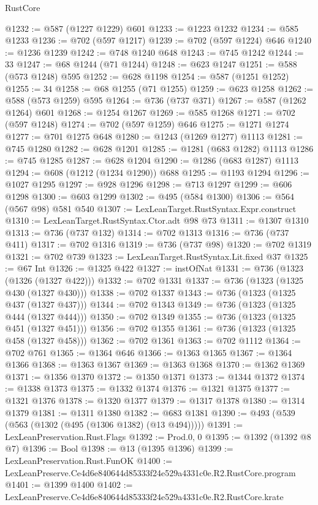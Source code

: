 \begin{lexlean}{RustCore}
\begin{coremodule}
@1232 := @587 (@1227 @1229) @601
@1233 := @1223 @1232
@1234 := @585 @1233
@1236 := @702 (@597 @1217)
@1239 := @702 (@597 @1224) @646
@1240 := @1236 @1239
@1242 := @748 @1240 @648
@1243 := @745 @1242
@1244 := 33
@1247 := @68 @1244 (@71 @1244)
@1248 := @623 @1247
@1251 := @588 (@573 @1248) @595
@1252 := @628 @1198
@1254 := @587 (@1251 @1252)
@1255 := 34
@1258 := @68 @1255 (@71 @1255)
@1259 := @623 @1258
@1262 := @588 (@573 @1259) @595
@1264 := @736 (@737 @371)
@1267 := @587 (@1262 @1264) @601
@1268 := @1254 @1267
@1269 := @585 @1268
@1271 := @702 (@597 @1248)
@1274 := @702 (@597 @1259) @646
@1275 := @1271 @1274
@1277 := @701 @1275 @648
@1280 := @1243 (@1269 @1277) @1113
@1281 := @745 @1280
@1282 := @628 @1201
@1285 := @1281 (@683 @1282) @1113
@1286 := @745 @1285
@1287 := @628 @1204
@1290 := @1286 (@683 @1287) @1113
@1294 := @608 (@1212 (@1234 @1290)) @688
@1295 := @1193 @1294
@1296 := @1027 @1295
@1297 := @928 @1296
@1298 := @713 @1297
@1299 := @606 @1298
@1300 := @603 @1299
@1302 := @495 (@584 @1300)
@1306 := @564 (@567 @98) @581 @540
@1307 := LexLeanTarget.RustSyntax.Expr.construct
@1310 := LexLeanTarget.RustSyntax.Ctor.adt @98 @73
@1311 := @1307 @1310
@1313 := @736 (@737 @132)
@1314 := @702 @1313
@1316 := @736 (@737 @411)
@1317 := @702 @1316
@1319 := @736 (@737 @98)
@1320 := @702 @1319
@1321 := @702 @739
@1323 := LexLeanTarget.RustSyntax.Lit.fixed @37
@1325 := @67 Int
@1326 := @1325 @422
@1327 := instOfNat
@1331 := @736 (@1323 (@1326 (@1327 @422)))
@1332 := @702 @1331
@1337 := @736 (@1323 (@1325 @430 (@1327 @430)))
@1338 := @702 @1337
@1343 := @736 (@1323 (@1325 @437 (@1327 @437)))
@1344 := @702 @1343
@1349 := @736 (@1323 (@1325 @444 (@1327 @444)))
@1350 := @702 @1349
@1355 := @736 (@1323 (@1325 @451 (@1327 @451)))
@1356 := @702 @1355
@1361 := @736 (@1323 (@1325 @458 (@1327 @458)))
@1362 := @702 @1361
@1363 := @702 @1112
@1364 := @702 @761
@1365 := @1364 @646
@1366 := @1363 @1365
@1367 := @1364 @1366
@1368 := @1363 @1367
@1369 := @1363 @1368
@1370 := @1362 @1369
@1371 := @1356 @1370
@1372 := @1350 @1371
@1373 := @1344 @1372
@1374 := @1338 @1373
@1375 := @1332 @1374
@1376 := @1321 @1375
@1377 := @1321 @1376
@1378 := @1320 @1377
@1379 := @1317 @1378
@1380 := @1314 @1379
@1381 := @1311 @1380
@1382 := @683 @1381
@1390 := @493 (@539 (@563 (@1302 (@495 (@1306 @1382) (@13 @494)))))
@1391 := LexLeanPreservation.Rust.Flags
@1392 := Prod.{0, 0}
@1395 := @1392 (@1392 @8 @7)
@1396 := Bool
@1398 := @13 (@1395 @1396)
@1399 := LexLeanPreservation.Rust.FunOK
@1400 := LexLeanPreserve.Ce4d6e840644d85333f24e529a4331c0e.R2.RustCore.program
@1401 := @1399 @1400
@1402 := LexLeanPreserve.Ce4d6e840644d85333f24e529a4331c0e.R2.RustCore.krate

\end{coremodule}
\end{lexlean}
